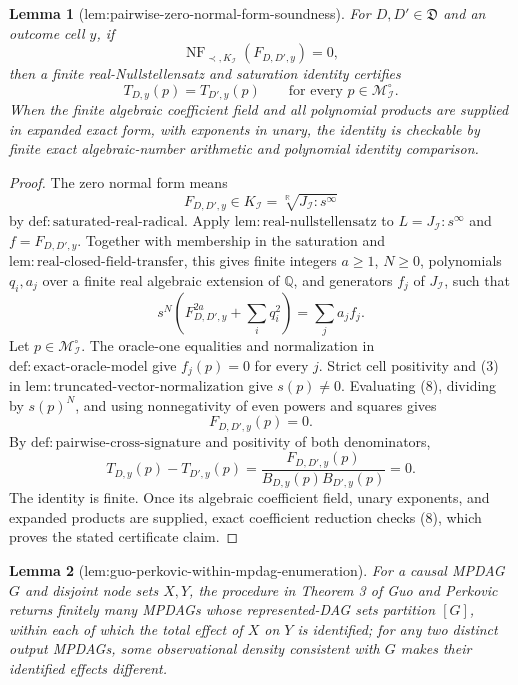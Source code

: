 \documentclass{article}
\newtheorem{lemma}{Lemma}
\begin{document}
\begin{lemma}[lem:pairwise-zero-normal-form-soundness]\label{lem:pairwise-zero-normal-form-soundness}
For \(D,D'\in\mathfrak D\) and an outcome cell \(y\), if
\[
 \operatorname{NF}_{\prec,K_{\mathcal I}}(F_{D,D',y})=0,
\]
then a finite real-Nullstellensatz and saturation identity certifies
\[
 T_{D,y}(p)=T_{D',y}(p)
 \qquad\text{for every }p\in\mathcal M_{\mathcal I}^{\circ}.
\]
When the finite algebraic coefficient field and all polynomial products are supplied in expanded exact form, with exponents in unary, the identity is checkable by finite exact algebraic-number arithmetic and polynomial identity comparison.
\end{lemma}
\begin{proof}
The zero normal form means
\[
 F_{D,D',y}\in K_{\mathcal I}
 =\sqrt[\mathbb R]{J_{\mathcal I}:s^\infty}
\]
by \(\mathrm{def{:}saturated\text{-}real\text{-}radical}\).  Apply \(\mathrm{lem{:}real\text{-}nullstellensatz}\) to \(L=J_{\mathcal I}:s^\infty\) and \(f=F_{D,D',y}\).  Together with membership in the saturation and \(\mathrm{lem{:}real\text{-}closed\text{-}field\text{-}transfer}\), this gives finite integers \(a\geq1\), \(N\geq0\), polynomials \(q_i,a_j\) over a finite real algebraic extension of \(\mathbb Q\), and generators \(f_j\) of \(J_{\mathcal I}\), such that
\[
 s^N\left(F_{D,D',y}^{2a}+\sum_iq_i^2\right)
 =\sum_j a_jf_j. \tag{8}
\]
Let \(p\in\mathcal M_{\mathcal I}^{\circ}\).  The oracle-one equalities and normalization in \(\mathrm{def{:}exact\text{-}oracle\text{-}model}\) give \(f_j(p)=0\) for every \(j\).  Strict cell positivity and (3) in \(\mathrm{lem{:}truncated\text{-}vector\text{-}normalization}\) give \(s(p)\neq0\).  Evaluating (8), dividing by \(s(p)^N\), and using nonnegativity of even powers and squares gives
\[
 F_{D,D',y}(p)=0. \tag{9}
\]
By \(\mathrm{def{:}pairwise\text{-}cross\text{-}signature}\) and positivity of both denominators,
\[
 T_{D,y}(p)-T_{D',y}(p)
 =\frac{F_{D,D',y}(p)}{B_{D,y}(p)B_{D',y}(p)}=0. \tag{10}
\]
The identity is finite.  Once its algebraic coefficient field, unary exponents, and expanded products are supplied, exact coefficient reduction checks (8), which proves the stated certificate claim.
\end{proof}

\begin{lemma}[lem:guo-perkovic-within-mpdag-enumeration]\label{lem:guo-perkovic-within-mpdag-enumeration}
For a causal MPDAG \(G\) and disjoint node sets \(X,Y\), the procedure in Theorem 3 of Guo and Perkovic returns finitely many MPDAGs whose represented-DAG sets partition \([G]\), within each of which the total effect of \(X\) on \(Y\) is identified; for any two distinct output MPDAGs, some observational density consistent with \(G\) makes their identified effects different.
\end{lemma}
\end{document}
